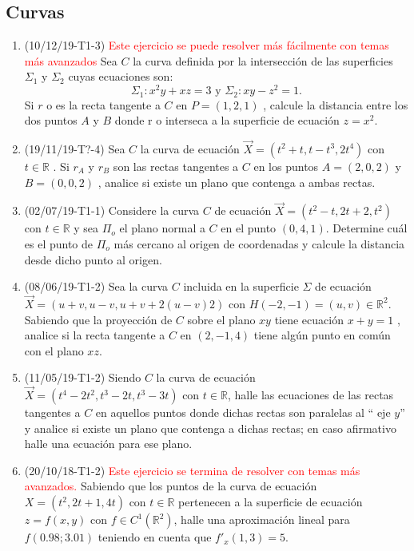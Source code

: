 \documentclass[12pt,a4paper]{article}
\newcommand{\red}[1]{\textcolor{red}{#1}}
\newcommand{\R}{\mathbb{R}}
\begin{document}
\subsection{Curvas}
\begin{enumerate}
	\item (10/12/19-T1-3) \red{Este ejercicio se puede resolver más fácilmente con temas más avanzados} Sea $C$ la curva definida por la intersección de las superficies $\Sigma_1$ y $\Sigma_2$ cuyas ecuaciones son:
	\[\Sigma_1 : x^2 y + x z = 3 \text{  y  } \Sigma_2 : x y - z^2 = 1 .\]
	Si \(r\) o es la recta tangente a \(C\) en \(P = ( 1 , 2 , 1 )\) , calcule la distancia entre los dos puntos \(A\) y \(B\) donde	r o interseca a la superficie de ecuación \(z = x^2 \).
	
	\item (19/11/19-T?-4) Sea $ C $ la curva de ecuación $ \vec{X} = ( t^2 + t , t - t^3 , 2 t^4 ) $ con $ t\in \R $ . Si $ r_A $ y $ r_B $ son las rectas tangentes a $ C $ en los puntos $ A = ( 2 , 0 , 2 ) $ y $ B = ( 0 , 0 , 2 ) $ , analice si existe un plano que contenga a ambas rectas.
	
	\item (02/07/19-T1-1) Considere la curva $ C $ de ecuación $ \vec{X} = ( t^2 - t , 2 t + 2 , t^2)$ con $ t\in \R$ y sea $ \Pi_o $ el plano normal a $ C $ en el punto $ ( 0 , 4 , 1 )  $. Determine cuál es el punto de $ \Pi_o $ más cercano al origen de coordenadas y calcule la distancia desde dicho punto al origen.
	
	\item (08/06/19-T1-2) Sea la curva $ C $ incluida en la superficie $ \Sigma $ de ecuación $\vec{X} = ( u + v , u - v , u + v + 2 ( u - v ) 2 )$ con $ H ( -2 , -1 ) =	( u , v ) \in\R^2  $. Sabiendo que la proyección de $ C $ sobre el plano $ xy $ tiene ecuación $ x + y = 1 $ , analice si la recta tangente a $ C $ en $ ( 2 , - 1 , 4 ) $ tiene algún punto en común con el plano $ xz  $.
	
	\item (11/05/19-T1-2) Siendo $ C $ la curva de ecuación $ \vec{X} = ( t^4 - 2 t^2 , t^3 - 2 t , t^3 - 3 t ) $ con $ t \in\R$, halle las ecuaciones de las	rectas tangentes a $ C $ en aquellos puntos donde dichas rectas son paralelas al “ eje $ y $” y analice si existe un plano que contenga a dichas rectas; en caso afirmativo halle una ecuación para ese plano.
	
	\item (20/10/18-T1-2) \red{Este ejercicio se termina de resolver con temas más avanzados.} Sabiendo que los puntos de la curva de ecuación $ X = ( t^2 , 2 t + 1 , 4 t ) $ con $ t\in\R $ pertenecen a la superficie de ecuación $ z = f ( x , y ) $ con $ f \in C^1 ( \R^2 )$, halle una aproximación lineal para $ f(0.98 ; 3.01)$ teniendo en cuenta que $ f'_x( 1 , 3 ) = 5  $.
	

\end{enumerate}
\end{document}
